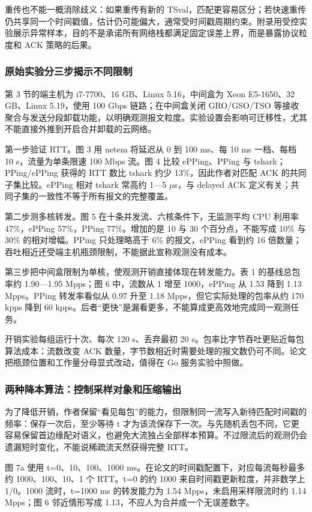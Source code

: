 \documentclass[UTF8,fontset=fandol,openany,11pt]{ctexbook}
\begin{document}
重传也不能一概消除歧义：如果重传有新的 TSval，匹配更容易区分；若快速重传仍共享同一个时间戳值，估计仍可能偏大，通常受时间戳周期约束。附录用受控实验展示异常样本，目的不是承诺所有网络栈都满足固定误差上界，而是暴露协议粒度和 ACK 策略的后果。

\subsubsection{原始实验分三步揭示不同限制}
第 3 节的端主机为 i7-7700、16 GB、Linux 5.16，中间盒为 Xeon E5-1650、32 GB、Linux 5.19，使用 100 Gbps 链路；在中间盒关闭 GRO/GSO/TSO 等接收聚合与发送分段卸载功能，以明确观测报文粒度。实验设置会影响可迁移性，尤其不能直接外推到开启合并卸载的云网络。

第一步验证 RTT。图 3 用 netem 将延迟从 0 到 100 ms、每 10 ms 一档、每档 10 s，流量为单条限速 100 Mbps 流。图 4 比较 ePPing、PPing 与 tshark；PPing/ePPing 获得的 RTT 数比 tshark 约少 13\%，因此作者对匹配 ACK 的共同子集比较。ePPing 相对 tshark 常高约 1—5 \ensuremath{\mu}s，与 delayed ACK 定义有关；共同子集的一致性不等于所有报文的完整覆盖。

第二步测多核转发。图 5 在十条并发流、六核条件下，无监测平均 CPU 利用率 47\%，ePPing 57\%，PPing 77\%。增加的是 10 与 30 个百分点，不能写成 10\% 与 30\% 的相对增幅。PPing 只处理略高于 6\% 的报文，ePPing 看到约 16 倍数量；吞吐相近还受端主机瓶颈限制，不能据此宣称观测没有成本。

第三步把中间盒限制为单核，使观测开销直接体现在转发能力。表 1 的基线总包率约 1.90—1.95 Mpps；图 6 中，流数从 1 增至 1000，ePPing 从 1.53 降到 1.13 Mpps。PPing 转发率看似从 0.97 升至 1.18 Mpps，但它实际处理的包率从约 170 kpps 降到 60 kpps。后者“更快”是漏看更多，不能算成更高效地完成同一观测任务。

开销实验每组运行十次、每次 120 s、丢弃最初 20 s。包率比字节吞吐更贴近每包算法成本：流数改变 ACK 数量，字节数相近时需要处理的报文数仍可不同。论文把瓶颈位置和工作量分母显式改动，值得在 Go 服务实验中照做。

\subsubsection{两种降本算法：控制采样对象和压缩输出}
为了降低开销，作者保留“看见每包”的能力，但限制同一流写入新待匹配时间戳的频率：保存一次后，至少等待 t 才为该流保存下一次。与先随机丢包不同，它更容易保留首边缘配对语义，也避免大流独占全部样本预算。不过限流后的观测仍会遗漏短时变化，不能说稀疏流天然获得完整 RTT。

图 7a 使用 t=0、10、100、1000 ms。在论文的时间戳配置下，对应每流每秒最多约 1000、100、10、1 个 RTT。t=0 的约 1000 来自时间戳更新粒度，并非数学上 1/0。1000 流时，t=1000 ms 的转发能力为 1.54 Mpps，未启用采样限流时约 1.14 Mpps；图 6 邻近情形写成 1.13，不应人为合并成一个无误差数字。
\end{document}
